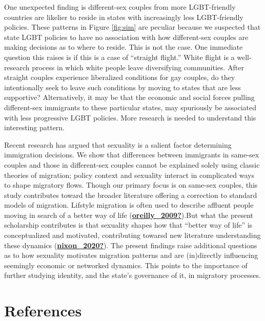 \documentclass[
  11pt,
]{article}
\begin{document}
One unexpected finding is different-sex couples from more LGBT-friendly countries are likelier to reside in states with increasingly less LGBT-friendly policies. These patterns in Figure \ref{fig:sim} are peculiar because we suspected that state LGBT policies to have no association with how different-sex couples are making decisions as to where to reside. This is not the case. One immediate question this raises is if this is a case of ``straight flight.'' White flight is a well-research process in which white people leave diversifying communities. After straight couples experience liberalized conditions for gay couples, do they intentionally seek to leave such conditions by moving to states that are less supportive? Alternatively, it may be that the economic and social forces pulling different-sex immigrants to these particular states, may spuriously be associated with less progressive LGBT policies. More research is needed to understand this interesting pattern.

Recent research has argued that sexuality is a salient factor determining immigration decisions. We show that differences between immigrants in same-sex couples and those in different-sex couples cannot be explained solely using classic theories of migration; policy context and sexuality interact in complicated ways to shape migratory flows. Though our primary focus is on same-sex couples, this study contributes toward the broader literature offering a correction to standard models of migration. Lifstyle migration is often used to describe affluent people moving in search of a better way of life (\protect\hyperlink{ref-oreilly_2009}{\textbf{oreilly\_2009?}}).But what the present scholarship contributes is that sexuality shapes how that ``better way of life'' is conceptualized and motivated, contributing towarsd new literature understanding these dynamics (\protect\hyperlink{ref-nixon_2020}{\textbf{nixon\_2020?}}). The present findings raise additional questions as to how sexuality motivates migration patterns and are (in)directly influencing seemingly economic or networked dynamics. This points to the importance of further studying identity, and the state's governance of it, in migratory processes.

\hypertarget{references}{%
\section{References}\label{references}}

\setlength{\parindent}{-0.2in}
\setlength{\leftskip}{0.2in}
\setlength{\parskip}{8pt}
\end{document}
